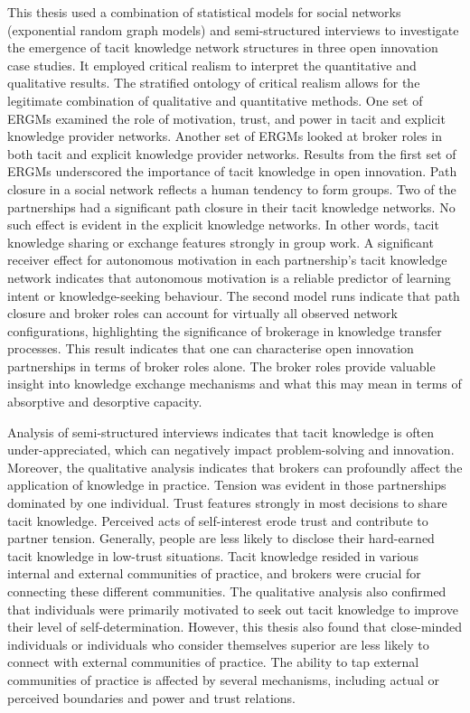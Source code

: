 \documentclass[12pt,table,xcdraw]{book}
\begin{document}
This thesis used a combination of statistical models for social networks (exponential random graph models) and semi-structured interviews to investigate the emergence of tacit knowledge network structures in three open innovation case studies. It employed critical realism to interpret the quantitative and qualitative results. The stratified ontology of critical realism allows for the legitimate combination of qualitative and quantitative methods. One set of ERGMs examined the role of motivation, trust, and power in tacit and explicit knowledge provider networks. Another set of ERGMs looked at broker roles in both tacit and explicit knowledge provider networks. Results from the first set of ERGMs underscored the importance of tacit knowledge in open innovation. Path closure in a social network reflects a human tendency to form groups. Two of the partnerships had a significant path closure in their tacit knowledge networks. No such effect is evident in the explicit knowledge networks. In other words, tacit knowledge sharing or exchange features strongly in group work. A significant receiver effect for autonomous motivation in each partnership's tacit knowledge network indicates that autonomous motivation is a reliable predictor of learning intent or knowledge-seeking behaviour. The second model runs indicate that path closure and broker roles can account for virtually all observed network configurations, highlighting the significance of brokerage in knowledge transfer processes. This result indicates that one can characterise open innovation partnerships in terms of broker roles alone. The broker roles provide valuable insight into knowledge exchange mechanisms and what this may mean in terms of absorptive and desorptive capacity. \medskip

Analysis of semi-structured interviews indicates that tacit knowledge is often under-appreciated, which can negatively impact problem-solving and innovation. Moreover, the qualitative analysis indicates that brokers can profoundly affect the application of knowledge in practice. Tension was evident in those partnerships dominated by one individual. Trust features strongly in most decisions to share tacit knowledge. Perceived acts of self-interest erode trust and contribute to partner tension. Generally, people are less likely to disclose their hard-earned tacit knowledge in low-trust situations. Tacit knowledge resided in various internal and external communities of practice, and brokers were crucial for connecting these different communities. The qualitative analysis also confirmed that individuals were primarily motivated to seek out tacit knowledge to improve their level of self-determination. However, this thesis also found that close-minded individuals or individuals who consider themselves superior are less likely to connect with external communities of practice. The ability to tap external communities of practice is affected by several mechanisms, including actual or perceived boundaries and power and trust relations. \medskip
\end{document}
